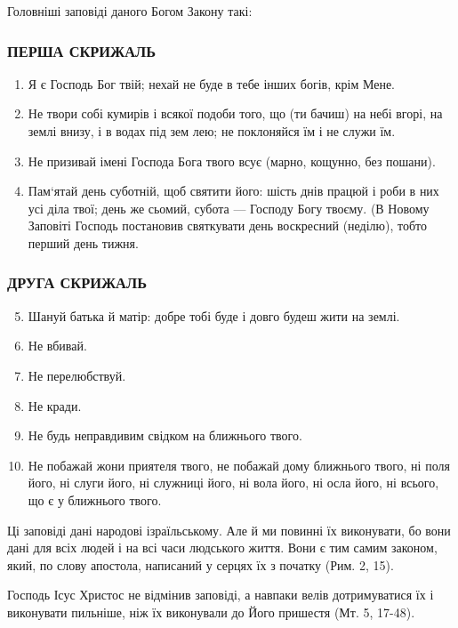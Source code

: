 \documentclass[main.tex]{subfiles}
\begin{document}
Головніші заповіді даного Богом Закону такі:

\subsubsection{ПЕРША СКРИЖАЛЬ}
\begin{enumerate}
    \item Я є Господь Бог твій; нехай не буде в тебе інших
    богів, крім Мене.
    \item Не твори собі кумирів і всякої подоби того, що
    (ти бачиш) на небі вгорі, на землі внизу, і в водах під зем
    лею; не поклоняйся їм і не служи їм.
    \item Не призивай імені Господа Бога твого всує (марно,
    кощунно, без пошани).
    \item Пам`ятай день суботній, щоб святити його: шість днів працюй і роби в них усі діла твої; день же сьомий, субота — Господу Богу твоєму. (В Новому Заповіті Господь постановив святкувати день воскресний (неділю), тобто перший день тижня.
\end{enumerate}

\subsubsection{ДРУГА СКРИЖАЛЬ}
\begin{enumerate}
    \setcounter{enumi}{4}
    \item Шануй батька й матір: добре тобі буде і довго будеш жити на землі.
    \item Не вбивай.
    \item Не перелюбствуй.
    \item Не кради.
    \item Не будь неправдивим свідком на ближнього твого.
    \item Не побажай жони приятеля твого, не побажай дому ближнього твого, ні поля його, ні слуги його, ні служниці його, ні вола його, ні осла його, ні всього, що є у ближнього твого.
\end{enumerate}

Ці заповіді дані народові ізраїльському. Але й ми повинні їх виконувати, бо вони дані для всіх людей і на всі часи людського життя. Вони є тим самим законом, який, по слову апостола, написаний у серцях їх з початку (Рим. 2, 15).

Господь Ісус Христос не відмінив заповіді, а навпаки велів дотримуватися їх і виконувати пильніше, ніж їх виконували до Його пришестя (Мт. 5, 17-48).
\end{document}
